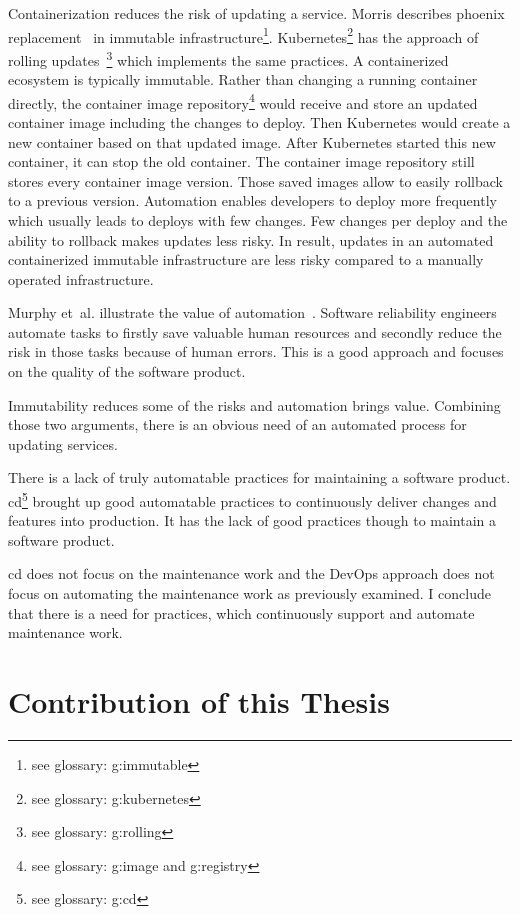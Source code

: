 Containerization reduces the risk of updating a service. Morris describes phoenix
replacement~\cite{infra_as_code_phoenix} in immutable infrastructure\footnote{see
  glossary: \gls{g:immutable}}. Kubernetes\footnote{see glossary: \gls{g:kubernetes}} has
the approach of rolling updates~\footnote{see glossary: \gls{g:rolling}} which implements
the same practices. A containerized ecosystem is typically immutable. Rather than changing
a running container directly, the container image repository\footnote{see glossary:
  \gls{g:image} and \gls{g:registry}} would receive and store an updated container image
including the changes to deploy. Then Kubernetes would create a new container based on
that updated image. After Kubernetes started this new container, it can stop the old
container. The container image repository still stores every container image
version. Those saved images allow to easily rollback to a previous version. Automation
enables developers to deploy more frequently which usually leads to deploys with few
changes. Few changes per deploy and the ability to rollback makes updates less risky. In
result, updates in an automated containerized immutable infrastructure are less risky
compared to a manually operated infrastructure.

Murphy et~al. illustrate the value of automation~\cite{sre_automation}. Software
reliability engineers automate tasks to firstly save valuable human resources and secondly
reduce the risk in those tasks because of human errors. This is a good approach and
focuses on the quality of the software product.

Immutability reduces some of the risks and automation brings value. Combining those two
arguments, there is an obvious need of an automated process for updating services.

There is a lack of truly automatable practices for maintaining a software
product. \gls{cd}\footnote{see glossary: \gls{g:cd}} brought up good automatable practices
to continuously deliver changes and features into production. It has the lack of good
practices though to maintain a software product.

\gls{cd} does not focus on the maintenance work and the DevOps approach does not focus on
automating the maintenance work as previously examined. I conclude that there is a need
for practices, which continuously support and automate maintenance work.

\section{Contribution of this Thesis}

